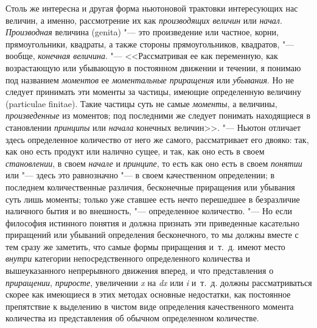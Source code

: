 Столь же интересна и другая форма ньютоновой трактовки интересующих нас
величин, а именно, рассмотрение их как
{\em производящих величин} или
{\em начал}. {\em Производная}
величина (genita) "--- это произведение или частное, корни, прямоугольники,
квадраты, а также стороны прямоугольников, квадратов, "--- вообще,
{\em конечная величина}. "--- <<Рассматривая ее как
переменную, как возрастающую или убывающую в постоянном движении и течении,
я понимаю под названием {\em моментов} ее
{\em моментальные приращения} или
{\em убывания}. Но не следует принимать эти моменты за
частицы, имеющие определенную величину (particulae finitae). Такие частицы
суть не самые {\em моменты}, а величины,
{\em произведенные} из моментов; под последними же
следует понимать находящиеся в становлении
{\em принципы} или {\em начала}
конечных величин>>. "--- Ньютон отличает здесь определенное количество от него
же самого, рассматривает его двояко: так, как оно есть продукт или налично
сущее, и так, как оно есть в своем {\em становлении}, в
своем {\em начале} и
{\em принципе}, то есть как оно есть в своем
{\em понятии} или "--- здесь это равнозначно "--- в своем
качественном определении; в последнем количественные различия, бесконечные
приращения или убывания суть лишь моменты; только уже ставшее есть нечто
перешедшее в безразличие наличного бытия и во внешность, "--- определенное
количество. "--- Но если философия истинного понятия и должна признать эти
приведенные касательно приращений или убываний определения бесконечного, то
мы должны вместе с тем сразу же заметить, что самые формы приращения
и~т.~д. имеют место {\em внутри} категории
непосредственного определенного количества и вышеуказанного непрерывного
движения вперед, и что представления о
{\em приращении}, {\em приросте},
увеличении {\em x} на {\em dx} или
{\em i} и~т.~д. должны рассматриваться скорее как
имеющиеся в этих методах основные недостатки, как постоянное препятствие к
выделению в чистом виде определения качественного момента количества из
представления об обычном определенном количестве.

